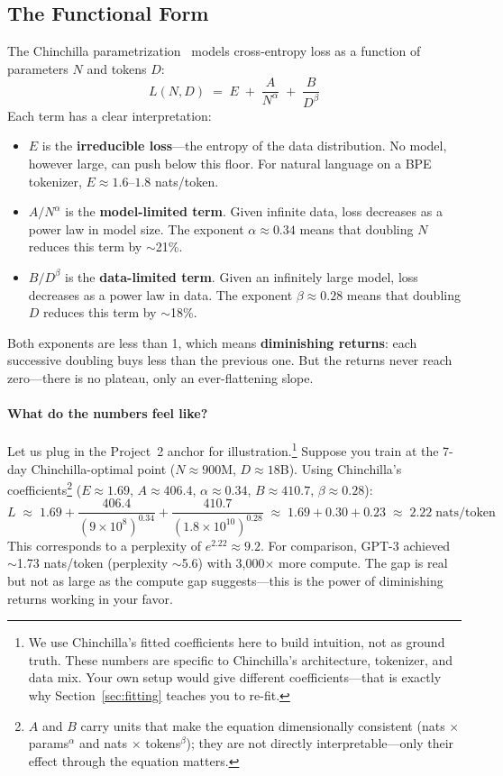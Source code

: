 \subsection{The Functional Form}
\label{sec:loss-form}

The Chinchilla parametrization~\cite{hoffmann2022training} models cross-entropy loss as a function of parameters $N$ and tokens $D$:
\begin{equation}
\label{eq:scaling-law}
L(N, D) \;=\; E \;+\; \frac{A}{N^{\alpha}} \;+\; \frac{B}{D^{\beta}}
\end{equation}
Each term has a clear interpretation:

\begin{itemize}[nosep]
  \item $E$ is the \textbf{irreducible loss}---the entropy of the data distribution. No model, however large, can push below this floor. For natural language on a BPE tokenizer, $E \approx 1.6$--$1.8$ nats/token.
  \item $A / N^\alpha$ is the \textbf{model-limited term}. Given infinite data, loss decreases as a power law in model size. The exponent $\alpha \approx 0.34$ means that doubling $N$ reduces this term by $\sim$21\%.
  \item $B / D^\beta$ is the \textbf{data-limited term}. Given an infinitely large model, loss decreases as a power law in data. The exponent $\beta \approx 0.28$ means that doubling $D$ reduces this term by $\sim$18\%.
\end{itemize}

Both exponents are less than 1, which means \textbf{diminishing returns}: each successive doubling buys less than the previous one. But the returns never reach zero---there is no plateau, only an ever-flattening slope.

\paragraph{What do the numbers feel like?} Let us plug in the Project~2 anchor for illustration.\footnote{We use Chinchilla's fitted coefficients here to build intuition, not as ground truth. These numbers are specific to Chinchilla's architecture, tokenizer, and data mix. Your own setup would give different coefficients---that is exactly why Section~\ref{sec:fitting} teaches you to re-fit.} Suppose you train at the 7-day Chinchilla-optimal point ($N \approx 900$M, $D \approx 18$B). Using Chinchilla's coefficients\footnote{$A$ and $B$ carry units that make the equation dimensionally consistent (nats $\times$ params$^{\alpha}$ and nats $\times$ tokens$^{\beta}$); they are not directly interpretable---only their effect through the equation matters.} ($E \approx 1.69$, $A \approx 406.4$, $\alpha \approx 0.34$, $B \approx 410.7$, $\beta \approx 0.28$):
\[
L \;\approx\; 1.69 + \frac{406.4}{(9 \times 10^8)^{0.34}} + \frac{410.7}{(1.8 \times 10^{10})^{0.28}} \;\approx\; 1.69 + 0.30 + 0.23 \;\approx\; 2.22 \;\text{nats/token}
\]
This corresponds to a perplexity of $e^{2.22} \approx 9.2$. For comparison, GPT-3 achieved $\sim$1.73 nats/token (perplexity $\sim$5.6) with 3,000$\times$ more compute. The gap is real but not as large as the compute gap suggests---this is the power of diminishing returns working in your favor.

